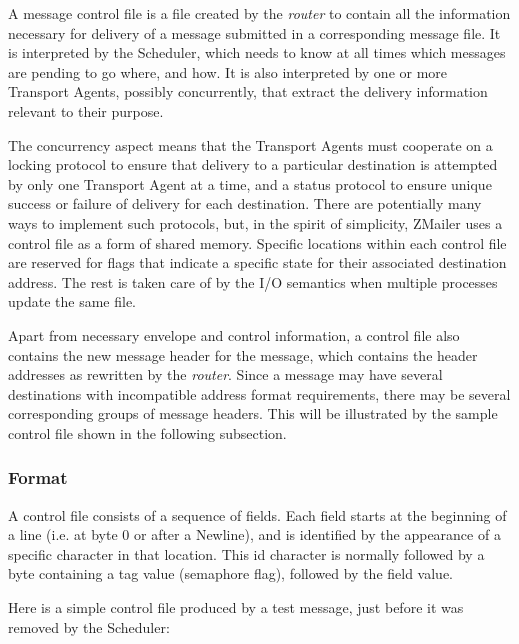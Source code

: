 A message control file is a file created by the {\em router\/} to contain all the
information necessary for delivery of a message submitted in a
corresponding message file.  It is interpreted by the Scheduler, which
needs to know at all times which messages are pending to go where, and how.
It is also interpreted by one or more Transport Agents, possibly
concurrently, that extract the delivery information relevant to their
purpose.

The concurrency aspect means that the Transport Agents must cooperate on a
locking protocol to ensure that delivery to a particular destination is
attempted by only one Transport Agent at a time, and a status protocol to
ensure unique success or failure of delivery for each destination.  There
are potentially many ways to implement such protocols, but, in the spirit
of simplicity, ZMailer uses a control file as a form of shared memory.
Specific locations within each control file are reserved for flags that
indicate a specific state for their associated destination address.  The
rest is taken care of by the I/O semantics when multiple processes update
the same file.

Apart from necessary envelope and control information, a control file also
contains the new message header for the message, which contains the header
addresses as rewritten by the {\em router\/}.  Since a message may have several
destinations with incompatible address format requirements, there may be
several corresponding groups of message headers.  This will be illustrated
by the sample control file shown in the following subsection.




\subsubsection{Format}

A control file consists of a sequence of fields.  Each field starts at the
beginning of a line (i.e. at byte 0 or after a Newline), and is identified
by the appearance of a specific character in that location.  This id
character is normally followed by a byte containing a tag value (semaphore
flag), followed by the field value.

Here is a simple control file produced by a test message, just before it
was removed by the Scheduler:


